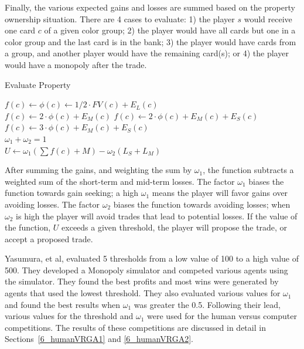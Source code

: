 Finally, the various expected gains and losses are summed based on the property
ownership situation. There are 4 cases to evaluate: 1) the player \(s\) would
receive one card \(c\) of a given color group; 2) the player would have all
cards but one in a color group and the last card is in the bank; 3) the player
would have cards from a group, and another player would have the remaining
card(s); or 4) the player would have a monopoly after the trade.
\begin{algorithm} 
\caption{Evaluate Property}
\label{alg_bigU}
\begin{algorithmic}
    \STATE $f(c) \gets \phi(c) \gets 1/2 \cdot FV(c) + E_L(c)$ \\
  \ENDIF
    \STATE $f(c) \gets 2 \cdot \phi(c) + E_M(c)$
  \ENDIF
    \STATE $f(c) \gets 2 \cdot \phi(c) + E_M(c) + E_S(c)$
  \ENDIF
    \STATE $f(c) \gets 3 \cdot \phi(c) + E_M(c) + E_S(c)$
  \ENDIF
\\
  \REQUIRE $\omega_1 + \omega_2 = 1$
\\
  $U \gets \omega_1(\sum f(c) + M) - \omega_2(L_S + L_M)$
\end{algorithmic}
\end{algorithm}

After summing the gains, and weighting the sum by \(\omega_1\), the function
subtracts a weighted sum of the short-term and mid-term losses. The factor
\(\omega_1\) biases the function towards gain seeking; a high \(\omega_1\) means
the player will favor gains over avoiding losses. The factor \(\omega_2\) biases
the function towards avoiding losses; when \(\omega_2\) is high the player will
avoid trades that lead to potential losses. If the value of the function, \(U\)
exceeds a given threshold, the player will propose the trade, or accept a
proposed trade. 

Yasumura, et al, evaluated 5 thresholds from a low value of 100 to a high value
of 500. They developed a Monopoly simulator and competed various agents using
the simulator. They found the best profits and most wins were generated by
agents that used the lowest threshold. They also evaluated various values for
\(\omega_1\) and found the best results when \(\omega_1\) was greater the 0.5.
Following their lead, various values for the threshold and \(\omega_1\) were used 
for the human versus computer competitions. The results of these competitions
are discussed in detail in Sections~\ref{6_humanVRGA1} and \ref{6_humanVRGA2}.

